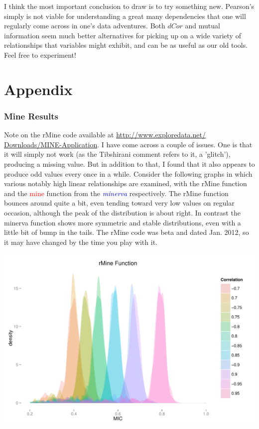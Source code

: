 \documentclass[english,nohyper,titlepage]{tufte-handout}\usepackage{graphicx, color}
\begin{document}
\vspace{1cm}
I think the most important conclusion to draw is to try something new.  Pearson's simply is not viable for understanding a great many dependencies that one will regularly come across in one's data adventures. Both $dCor$ and mutual information seem much better alternatives for picking up on a wide variety of relationships that variables might exhibit, and can be as useful as our old tools.  Feel free to experiment!



\newpage

\part{Appendix} %

\section{Mine Results}
Note on the rMine code available at \href{http://www.exploredata.net/Downloads/MINE-Application}{http://www.exploredata.net/
Downloads/MINE-Application}. I have come across a couple of issues.  One is that it will simply not work (as the Tibshirani comment refers to it, a 'glitch'), producing a missing value.  But in addition to that, I found that it also appears to produce odd values every once in a while.  Consider the following graphs in which various notably high linear relationships are examined, with the rMine function and the \textcolor{red}{mine} function from the \textcolor{blue}{\emph{minerva}} respectively.  The rMine function bounces around quite a bit, even tending toward very low values on regular occasion, although the peak of the distribution is about right. In contrast the minerva function shows more symmetric and stable distributions, even with a little bit of bump in the tails.  The rMine code was beta and dated Jan. 2012, so it may have changed by the time you play with it. 



\includegraphics[scale=.30]{images/MICDensitiesHiCorr_mymine}
\end{document}
